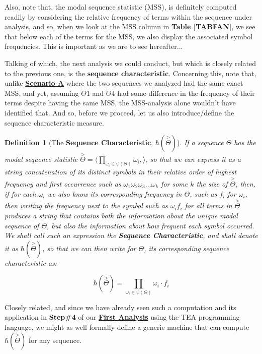 \documentclass[a4paper, 18pt]{book} %
\newtheorem{defn}{Definition}
\begin{document}
Also, note that, the modal sequence statistic (MSS), is definitely computed readily by considering the relative frequency of terms within the sequence under analysis, and so, when we look at the MSS column in \textbf{Table \ref{TABFAN}}, we see that below each of the terms for the MSS, we also display the associated symbol frequencies. This is important as we are to see hereafter...

Talking of which, the next analysis we could conduct, but which is closely related to the previous one, is the \textbf{sequence characteristic}. Concerning this, note that, unlike \textbf{\hyperref[SECSCENA]{Scenario A}} where the two sequences we analyzed had the same exact MSS, and yet, assuming $\Theta1$ and $\Theta4$ had some difference in the frequency of their terms despite having the same MSS, the MSS-analysis alone wouldn't have identified that. And so, before we proceed, let us also introduce/define the sequence characteristic measure.

\begin{defn}[The \textbf{Sequence Characteristic}, $\hbar(\overset{>}{\Theta})$]
\label{DEFSEQCHAR}
If a sequence $\Theta$ has the modal sequence statistic $\overset{>}{\Theta} = \langle \prod\limits_{\omega_i \in \psi(\Theta)} \omega_i, \rangle$, so that we can express it as a string concatenation of its distinct symbols in their relative order of highest frequency and first occurrence such as $\omega_1\omega_2\omega_3\ldots\omega_k$ for some $k$ the size of $\overset{>}{\Theta}$, then, if for each $\omega_i$ we also know its corresponding frequency in $\Theta$, such as $f_i$ for $\omega_i$, then writing the frequency next to the symbol such as $\omega_if_i$ for all terms in $\overset{>}{\Theta}$ produces a string that contains both the information about the unique modal sequence of $\Theta$, but also the information about how frequent each symbol occurred. We shall call such an expression the \textbf{Sequence Characteristic}, and shall denote it as  $\hbar(\overset{>}{\Theta})$, so that we can then write for $\Theta$, its corresponding sequence characteristic as:

\begin{equation}
\label{EQSECHARDEF}
 \hbar(\overset{>}{\Theta}) = \prod\limits_{\omega_i \in \psi(\Theta)} \omega_i\cdot f_i
\end{equation}

\end{defn}

Closely related, and since we have already seen such a computation and its application in \textbf{Step\#4} of our \textbf{\hyperref[SECFANAL]{First Analysis}} using the TEA programming language, we might as well formally define a generic machine that can compute $\hbar(\overset{>}{\Theta})$ for any sequence.\\
\end{document}
